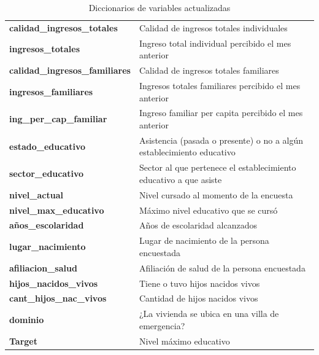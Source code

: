 \documentclass[a4paper]{article}
\begin{document}
\begin{table}[H]
\begin{tabular}{ll}
        \textbf{calidad\_ingresos\_totales}    & Calidad de ingresos totales individuales \\ 
        \textbf{ingresos\_totales}             & Ingreso total individual percibido el mes anterior \\
        \textbf{calidad\_ingresos\_familiares} & Calidad de ingresos totales familiares \\ 
        \textbf{ingresos\_familiares}          & Ingresos totales familiares percibido el mes anterior \\ 
        \textbf{ing\_per\_cap\_familiar}       & Ingreso familiar per capita percibido el mes anterior \\ 
        \textbf{estado\_educativo}             & Asistencia (pasada o presente) o no a algún establecimiento educativo \\ 
        \textbf{sector\_educativo}             & Sector al que pertenece el establecimiento educativo a que asiste \\     
        \textbf{nivel\_actual}                 & Nivel cursado al momento de la encuesta \\                               
        \textbf{nivel\_max\_educativo}         & Máximo nivel educativo que se cursó \\                                   
        \textbf{años\_escolaridad}             & Años de escolaridad alcanzados \\                                        
        \textbf{lugar\_nacimiento}             & Lugar de nacimiento de la persona encuestada \\                          
        \textbf{afiliacion\_salud}             & Afiliación de salud de la persona encuestada \\                          
        \textbf{hijos\_nacidos\_vivos}         & Tiene o tuvo hijos nacidos vivos \\                                      
        \textbf{cant\_hijos\_nac\_vivos}       & Cantidad de hijos nacidos vivos \\                                       
        \textbf{dominio}                       & ¿La vivienda se ubica en una villa de emergencia? \\                     
        \textbf{Target}                        & Nivel máximo educativo \\  
        \midrule                                         
    \end{tabular}
    \caption{Diccionarios de variables actualizadas}
    \label{dictionary}
    \end{table}
 
\end{document}
